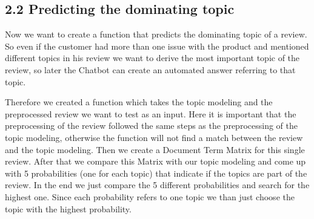 \documentclass[
]{article}
\begin{document}
\hypertarget{predicting-the-dominating-topic}{%
\subsection{2.2 Predicting the dominating
topic}\label{predicting-the-dominating-topic}}

Now we want to create a function that predicts the dominating topic of a
review. So even if the customer had more than one issue with the product
and mentioned different topics in his review we want to derive the most
important topic of the review, so later the Chatbot can create an
automated answer referring to that topic.

Therefore we created a function which takes the topic modeling and the
preprocessed review we want to test as an input. Here it is important
that the preprocessing of the review followed the same steps as the
preprocessing of the topic modeling, otherwise the function will not
find a match between the review and the topic modeling. Then we create a
Document Term Matrix for this single review. After that we compare this
Matrix with our topic modeling and come up with 5 probabilities (one for
each topic) that indicate if the topics are part of the review. In the
end we just compare the 5 different probabilities and search for the
highest one. Since each probability refers to one topic we than just
choose the topic with the highest probability.
\end{document}
